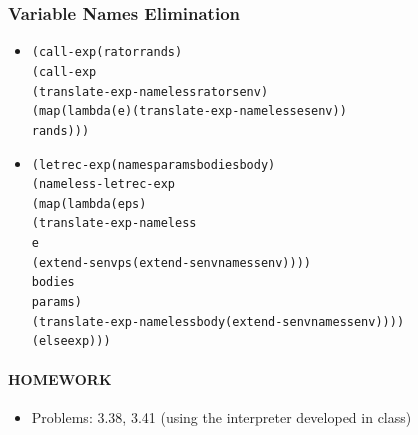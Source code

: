 \documentclass{beamer}
\begin{document}
\begin{frame}[fragile]
\frametitle{Variable Names Elimination}
\begin{tiny}
\begin{itemize}
\item<1->
\begin{alltt}
    (call-exp (rator rands)
              (call-exp
               (translate-exp-nameless rator senv)
               (map (lambda (e) (translate-exp-nameless e senv))
                    rands)))
\end{alltt}

\item<2->
\begin{alltt}
    (letrec-exp (names params bodies body)
                (nameless-letrec-exp
                 (map (lambda (e ps)
                        (translate-exp-nameless
                         e
                         (extend-senv ps (extend-senv names senv))))
                      bodies
                      params)
                 (translate-exp-nameless body (extend-senv names senv))))
    (else exp)))
\end{alltt}

\end{itemize}
\end{tiny}
\end{frame}



\begin{frame}[fragile]
\framesubtitle{HOMEWORK}
\begin{scriptsize}
\begin{itemize}
\item<1-> Problems: 3.38, 3.41 (using the interpreter developed in class)

\end{itemize}
\end{scriptsize}
\end{frame}
\end{document}

